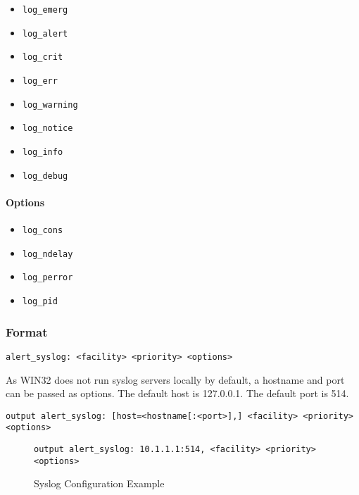 \documentclass[english]{report}
\newenvironment{note}{
\samepage
    \vspace{10pt}{\textsf{
        {\hspace{7pt}\Huge{$\triangle$\hspace{-12.5pt}{\Large{$^!$}}}}\hspace{5pt}
        {\Large{NOTE}}
    }
    }
   \begin{center}
    \par\vspace{-17pt}

    \begin{lrbox}{\savepar}
    \begin{minipage}[r]{6in}
}
{
    \end{minipage}
    \end{lrbox}
    \fbox{
        \usebox{
            \savepar
	}
    }
    \par\vskip10pt
    \end{center}
}
\newenvironment{note}{
        \begin{rawhtml}
        <p><table border="1"><tr><td><b>
        Note:&nbsp;&nbsp;</b>
        \end{rawhtml}
}{
        \begin{rawhtml}
        </b></td></tr></table></p>
        \end{rawhtml}
}
\begin{document}
\begin{itemize}
\item \texttt{log\_emerg} 
\item \texttt{log\_alert}
\item \texttt{log\_crit}
\item \texttt{log\_err}
\item \texttt{log\_warning} 
\item \texttt{log\_notice}
\item \texttt{log\_info}
\item \texttt{log\_debug}
\end{itemize}

\paragraph{Options}

\begin{itemize}
\item \texttt{log\_cons} 
\item \texttt{log\_ndelay}
\item \texttt{log\_perror}
\item \texttt{log\_pid}
\end{itemize}

\subsubsection{Format}

\begin{verbatim}
alert_syslog: <facility> <priority> <options>
\end{verbatim}


\begin{note}
As WIN32 does not run syslog servers locally by default, a hostname and port
can be passed as options.  The default host is 127.0.0.1.  The default port is
514.
\end{note}

\begin{verbatim}
output alert_syslog: [host=<hostname[:<port>],] <facility> <priority> <options>
\end{verbatim}

\begin{figure}[!hbpt]
\begin{verbatim}
output alert_syslog: 10.1.1.1:514, <facility> <priority> <options>
\end{verbatim}

\caption{Syslog Configuration Example\label{syslog example}}
\end{figure}
\end{document}
